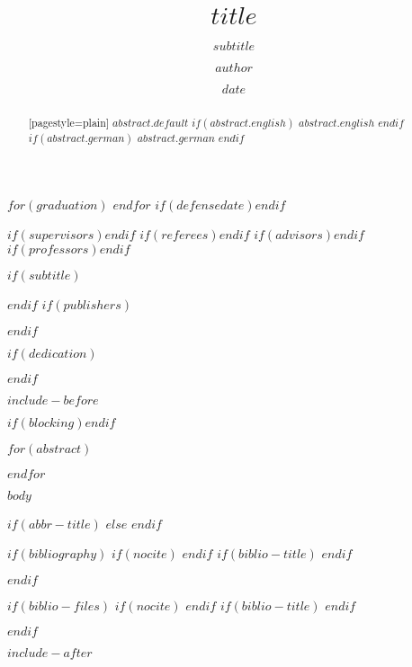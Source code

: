 \documentclass[english,ngerman,BCOR=6mm,cdgeometry=no,DIV=13,twoside$if(cd)$,cd=$cd$$endif$$if(chapterpage)$,chapterpage=true$endif$$if(sfmath)$,cdmath=false$endif$$if(replacefont)$,cdfont=false,cdhead=false$endif$]{tudscrreprt}
\begin{document}
\date{$date$}
\author{$author$}
\title{$title$}
$for(graduation)$
$endfor$
$if(defensedate)$$endif$

$if(supervisors)$$endif$
$if(referees)$$endif$
$if(advisors)$$endif$
$if(professors)$$endif$

$if(subtitle)$\subtitle{$subtitle$}$endif$
$if(publishers)$\publishers{$publishers$}$endif$

$if(dedication)$\dedication{$dedication$}$endif$

\renewcommand*{\partpagestyle}{plain}

$include-before$

\maketitle


\confirmation

$if(blocking)$\blocking$endif$

$for(abstract)$
\begin{abstract}[pagestyle=plain]
$abstract.default$
$if(abstract.english)$
\nextabstract[english]
$abstract.english$
$endif$
$if(abstract.german)$
\nextabstract[ngerman]
$abstract.german$
$endif$
\end{abstract}
$endfor$

\tableofcontents

$body$

\listoffigures

\listoftables

\lstlistoflistings

$if(abbr-title)$
\printacronyms[sort,heading=chapter*,name=$abbr-title$]
$else$
\printacronyms[sort,heading=chapter*]
$endif$

$if(bibliography)$
$if(nocite)$
\nocite{*}
$endif$
$if(biblio-title)$
\renewcommand{\bibname}{$biblio-title$}
$endif$


$endif$

$if(biblio-files)$
$if(nocite)$
\nocite{*}
$endif$
$if(biblio-title)$
\renewcommand{\bibname}{$biblio-title$}
$endif$


$endif$

$include-after$
\end{document}
